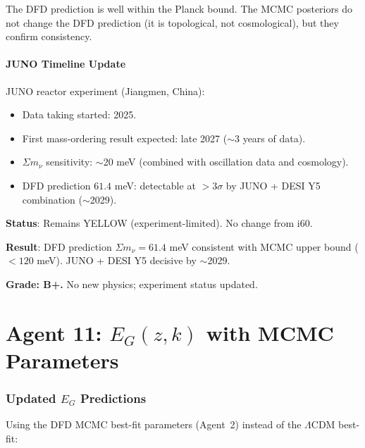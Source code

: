 \documentclass[11pt,a4paper]{article}
\begin{document}
The DFD prediction is well within the Planck bound. The MCMC posteriors do not change the DFD prediction (it is topological, not cosmological), but they confirm consistency.

\subsection{JUNO Timeline Update}

JUNO reactor experiment (Jiangmen, China):
\begin{itemize}
\item Data taking started: 2025.
\item First mass-ordering result expected: late 2027 ($\sim$3 years of data).
\item $\Sigma m_\nu$ sensitivity: $\sim$20 meV (combined with oscillation data and cosmology).
\item DFD prediction $61.4$ meV: detectable at $> 3\sigma$ by JUNO + DESI Y5 combination ($\sim$2029).
\end{itemize}

\textbf{Status}: Remains YELLOW (experiment-limited). No change from i60.

\begin{tcolorbox}[colback=yellow!5!white, colframe=yellow!60!black, title={Agent 10: $\Sigma m_\nu$ Remains YELLOW --- Experiment-Limited}]
\textbf{Result}: DFD prediction $\Sigma m_\nu = 61.4$ meV consistent with MCMC upper bound ($< 120$ meV). JUNO + DESI Y5 decisive by $\sim$2029.

\textbf{Grade: B+.} No new physics; experiment status updated.
\end{tcolorbox}


\part{Agent 11: $E_G(z,k)$ with MCMC Parameters}
\label{part:eg}

\section{Updated $E_G$ Predictions}

Using the DFD MCMC best-fit parameters (Agent~2) instead of the $\Lambda$CDM best-fit:
\end{document}
